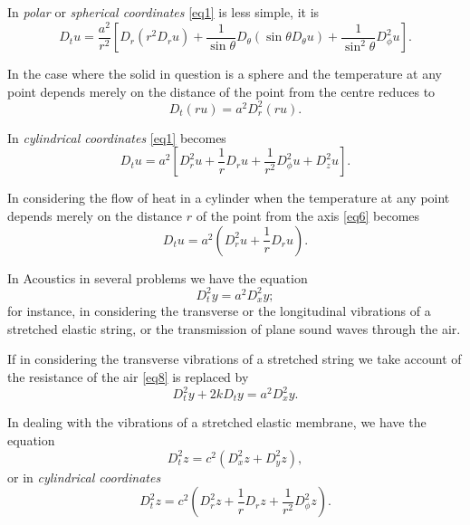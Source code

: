\documentclass[oneside,12pt]{book}
\begin{document}
In \textit{polar} or \textit{spherical coordinates} \eqref{eq1} is less simple, it is 
\begin{equation}
    D_tu=\frac{a^2}{r^2}\left[D_r(r^2D_ru)+\frac{1}{\sin\theta}D_\theta(\sin\theta D_\theta u)+\frac{1}{\sin^2\theta}D_\phi^2u\right].
    \label{eq4}
\end{equation} \par 
In the case where the solid in question is a sphere and the temperature at any point depends merely on the distance of the point from the centre  reduces to 
\begin{equation}
    \label{eq5}
    D_t(ru)=a^2D_r^2(ru). 
\end{equation} \par 

In \textit{cylindrical coordinates} \eqref{eq1} becomes 
\begin{equation}
    \label{eq6}
    D_tu=a^2[D_r^2u+\frac{1}{r}D_ru+\frac{1}{r^2}D_\phi^2u+D_z^2u].
\end{equation} \par 

In considering the flow of heat in a cylinder when the temperature at any point depends merely on the distance $r$ of the point from the axis \eqref{eq6} becomes 
\begin{equation}
    \label{eq7}
    D_tu=a^2(D_r^2u+\frac{1}{r}D_ru).
\end{equation} \par 
In Acoustics in several problems we have the equation
\begin{equation}
    \label{eq8}
    D_t^2y=a^2D_x^2y;
\end{equation}
for instance, in considering the transverse or the longitudinal vibrations of a stretched elastic string, or the transmission of plane sound waves through the air. \par 

If in considering the transverse vibrations of a stretched string we take account of the resistance of the air \eqref{eq8} is replaced by 
\begin{equation}
    \label{eq9}
    D_t^2y+2kD_ty=a^2D_x^2y. 
\end{equation} \par 

In dealing with the vibrations of a stretched elastic membrane, we have the equation 
\begin{equation}
    \label{eq10}
    D_t^2z=c^2(D_x^2z+D_y^2z),
\end{equation}
or in \textit{cylindrical coordinates}
\begin{equation}
    \label{eq11}
    D_t^2z=c^2(D_r^2z+\frac{1}{r}D_rz+\frac{1}{r^2}D_\phi^2z).
\end{equation} \par 
\end{document}
